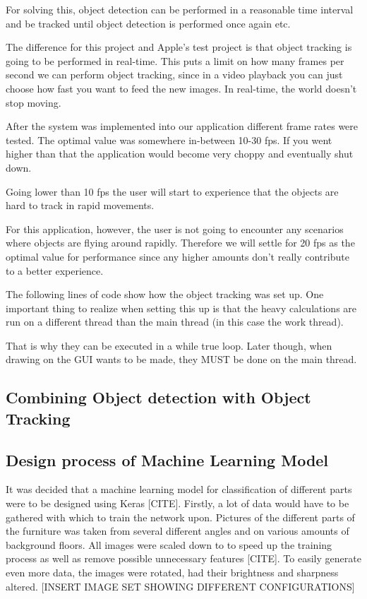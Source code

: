 For solving this, object detection can be performed in a reasonable time interval and be tracked until object detection is performed once again etc.

\cite{ObjectTracking}
The difference for this project and Apple's test project is that object tracking is going to be performed in real-time. This puts a limit on how many frames per second we can perform object tracking, since in a video playback you can just choose how fast you want to feed the new images. In real-time, the world doesn't stop moving.

After the system was implemented into our application different frame rates were tested. The optimal value was somewhere in-between 10-30 fps. If you went higher than that the application would become very choppy and eventually shut down.

Going lower than 10 fps the user will start to experience that the objects are hard to track in rapid movements.

For this application, however, the user is not going to encounter any scenarios where objects are flying around rapidly. Therefore we will settle for 20 fps as the optimal value for performance since any higher amounts don't really contribute to a better experience.

The following lines of code show how the object tracking was set up. One important thing to realize when setting this up is that the heavy calculations are run on a different thread than the main thread (in this case the work thread). 

That is why they can be executed in a while true loop. Later though, when drawing on the GUI wants to be made, they MUST be done on the main thread.




\subsection{Combining Object detection with Object Tracking}

\subsection{Design process of Machine Learning Model}
It was decided that a machine learning model for classification of different parts were to be designed using Keras [CITE]. Firstly, a lot of data would have to be gathered with which to train the network upon. Pictures of the different parts of the furniture was taken from several different angles and on various amounts of background floors. 
All images were scaled down to \imageSize to speed up the training process as well as remove possible unnecessary features [CITE]. To easily generate even more data, the images were rotated, had their brightness and sharpness altered. 
[INSERT IMAGE SET SHOWING DIFFERENT CONFIGURATIONS]
 
